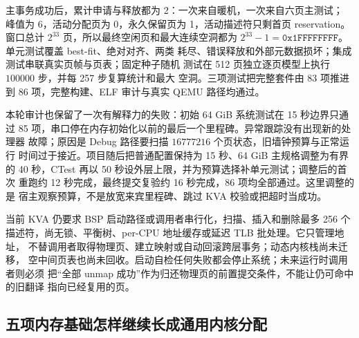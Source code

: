 主事务成功后，累计申请与释放都为 2：一次来自暖机，一次来自六页主测试；
峰值为 6，活动分配页为 0，永久保留页为 1，活动描述符只剩首页 reservation。
窗口总计 \(2^{33}\) 页，所以最终空闲页和最大连续空洞都为
\(2^{33}-1=\mathtt{0x1FFFFFFFF}\)。单元测试覆盖 best-fit、绝对对齐、两类
耗尽、错误释放和外部元数据损坏；集成测试串联真实页帧与页表；固定种子随机
测试在 512 页独立逐页模型上执行 \(100000\) 步，并每 257 步复算统计和最大
空洞。三项测试把完整套件由 83 项推进到 86 项，完整构建、ELF 审计与真实
QEMU 路径均通过。

本轮审计也保留了一次有解释力的失败：初始 64 GiB 系统测试在 15 秒边界只通过
85 项，串口停在内存初始化以前的最后一个里程碑。异常跟踪没有出现新的处理器
故障；原因是 Debug 路径要扫描 \(16777216\) 个页状态，旧墙钟预算与正常运行
时间过于接近。项目随后把普通配置保持为 15 秒、64 GiB 主规格调整为有界的
40 秒，CTest 再以 50 秒设外层上限，并为预算选择补单元测试；调整后的首次
重跑约 12 秒完成，最终提交复验约 16 秒完成，86 项均全部通过。这里调整的是
宿主观察预算，不是放宽来宾里程碑、跳过 KVA 校验或把超时当成功。

当前 KVA 仍要求 BSP 启动路径或调用者串行化，扫描、插入和删除最多 256 个
描述符，尚无锁、平衡树、per-CPU 地址缓存或延迟 TLB 批处理。它只管理地址，
不替调用者取得物理页、建立映射或自动回滚跨层事务；动态内核栈尚未迁移，
空中间页表也尚未回收。启动自检任何失败都会停止系统；未来运行时调用者则必须
把“全部 unmap 成功”作为归还物理页的前置提交条件，不能让仍可命中的旧翻译
指向已经复用的页。

\subsection{五项内存基础怎样继续长成通用内核分配}

